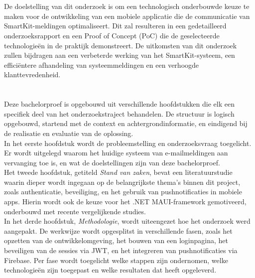 \section{}%
\label{sec:onderzoeksdoelstelling}

\noindent De doelstelling van dit onderzoek is om een technologisch onderbouwde keuze te maken voor de ontwikkeling van een mobiele applicatie die de communicatie van SmartKit-meldingen optimaliseert. Dit zal resulteren in een gedetailleerd onderzoeksrapport en een Proof of Concept (PoC) die de geselecteerde technologieën in de praktijk demonstreert. De uitkomsten van dit onderzoek zullen bijdragen aan een verbeterde werking van het SmartKit-systeem, een efficiëntere afhandeling van systeemmeldingen en een verhoogde klanttevredenheid. \\

\section{}%
\label{sec:opzet-bachelorproef}

Deze bachelorproef is opgebouwd uit verschillende hoofdstukken die elk een specifiek deel van het onderzoekstraject behandelen. De structuur is logisch opgebouwd, startend met de context en achtergrondinformatie, en eindigend bij de realisatie en evaluatie van de oplossing.\\

In het eerste hoofdstuk wordt de probleemstelling en onderzoeksvraag toegelicht. Er wordt uitgelegd waarom het huidige systeem van e-mailmeldingen aan vervanging toe is, en wat de doelstellingen zijn van deze bachelorproef.\\

Het tweede hoofdstuk, getiteld \emph{Stand van zaken}, bevat een literatuurstudie waarin dieper wordt ingegaan op de belangrijkste thema’s binnen dit project, zoals authenticatie, beveiliging, en het gebruik van pushnotificaties in mobiele apps. Hierin wordt ook de keuze voor het .NET MAUI-framework gemotiveerd, onderbouwd met recente vergelijkende studies.\\

In het derde hoofdstuk, \emph{Methodologie}, wordt uiteengezet hoe het onderzoek werd aangepakt. De werkwijze wordt opgesplitst in verschillende fasen, zoals het opzetten van de ontwikkelomgeving, het bouwen van een loginpagina, het beveiligen van de sessies via JWT, en het integreren van pushnotificaties via Firebase. Per fase wordt toegelicht welke stappen zijn ondernomen, welke technologieën zijn toegepast en welke resultaten dat heeft opgeleverd.\\

